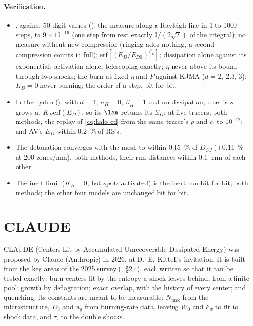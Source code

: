\paragraph{Verification.}
\begin{itemize}
\item {}, against 50-digit values ():
  the measure along a Rayleigh line in 1 to 1000 steps, to $9\times10^{-16}$
  (one step from rest exactly $3/(2\sqrt2)$ of the integral); no measure
  without new compression (ringing adds nothing, a second compression
  counts in full); $\mathrm{erf}[(E_D/E_{D0})^{\beta_H}]$; dissipation alone
  against its exponential; activation alone, telescoping exactly; $\eta$
  never above its bound through two shocks; the burn at fixed $\eta$ and $P$
  against KJMA ($d$ = 2, 2.3, 3); $K_B = 0$ never burning; the order of a
  step, bit for bit.
\item In the hydro (): with $d = 1$,
  $n_H = 0$, $\beta_H = 1$ and no dissipation, a cell's $s$ grows at $K_B
  \mathrm{erf}(E_D)$, so its $\lam$ returns its $E_D$: at five tracers, both
  methods, the replay of \cref{eq:halo-ed} from the same tracer's $\rho$ and
  $e$, to $10^{-12}$; and AV's $E_D$ within 0.2~\% of RS's.
\item The detonation converges with the mesh to within 0.15~\% of
  $D_{CJ}$ (+0.11~\% at 200 zones/mm), both methods, their run distances
  within 0.1~mm of each other.
\item The inert limit ($K_B = 0$, hot spots activated) is the inert run bit
  for bit, both methods; the other four models are unchanged bit for bit.
\end{itemize}

\section{CLAUDE}
\label{sec:claude}

CLAUDE (Centers Lit by Accumulated Unrecoverable Dissipated Energy) was
proposed by Claude (Anthropic) in 2026, at D.~E.~Kittell's invitation. It is
built from the key areas of the 2025 survey (\cite{kittell2025sand}, \S 2.4),
each written so that it can be tested exactly: burn centers lit by the
entropy a shock leaves behind, from a finite pool; growth by deflagration;
exact overlap, with the history of every center; and quenching. Its
constants are meant to be measurable: $N_{\max}$ from the microstructure,
$D_0$ and $n_g$ from burning-rate data, leaving $W_0$ and $k_w$ to fit to
shock data, and $\tau_q$ to the double shocks.

